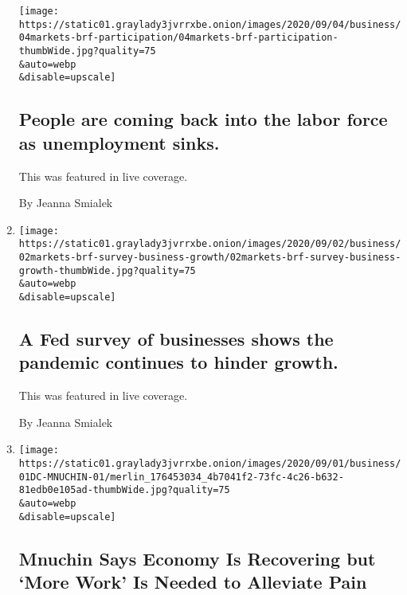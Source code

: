 \begin{enumerate}
  \texttt{[image: https://static01.graylady3jvrrxbe.onion/images/2020/09/04/business/04markets-brf-participation/04markets-brf-participation-thumbWide.jpg?quality=75\\\&auto=webp\\\&disable=upscale]}

  \hypertarget{people-are-coming-back-into-the-labor-force-as-unemployment-sinks}{%
  \subsection{People are coming back into the labor force as
  unemployment
  sinks.}\label{people-are-coming-back-into-the-labor-force-as-unemployment-sinks}}

  This was featured in live coverage.

  By Jeanna Smialek
\item
  \href{/live/2020/09/02/business/stock-market-today-coronavirus/a-fed-survey-of-businesses-shows-the-pandemic-continues-to-hinder-growth}{}

  \texttt{[image: https://static01.graylady3jvrrxbe.onion/images/2020/09/02/business/02markets-brf-survey-business-growth/02markets-brf-survey-business-growth-thumbWide.jpg?quality=75\\\&auto=webp\\\&disable=upscale]}

  \hypertarget{a-fed-survey-of-businesses-shows-the-pandemic-continues-to-hinder-growth}{%
  \subsection{A Fed survey of businesses shows the pandemic continues to
  hinder
  growth.}\label{a-fed-survey-of-businesses-shows-the-pandemic-continues-to-hinder-growth}}

  This was featured in live coverage.

  By Jeanna Smialek
\item
  \href{/2020/09/01/business/economy/mnuchin-coronavirus.html}{}

  \texttt{[image: https://static01.graylady3jvrrxbe.onion/images/2020/09/01/business/01DC-MNUCHIN-01/merlin\_176453034\_4b7041f2-73fc-4c26-b632-81edb0e105ad-thumbWide.jpg?quality=75\\\&auto=webp\\\&disable=upscale]}

  \hypertarget{mnuchin-says-economy-is-recovering-but-more-work-is-needed-to-alleviate-pain}{%
  \subsection{Mnuchin Says Economy Is Recovering but `More Work' Is
  Needed to Alleviate
  Pain}\label{mnuchin-says-economy-is-recovering-but-more-work-is-needed-to-alleviate-pain}}


\end{enumerate}
